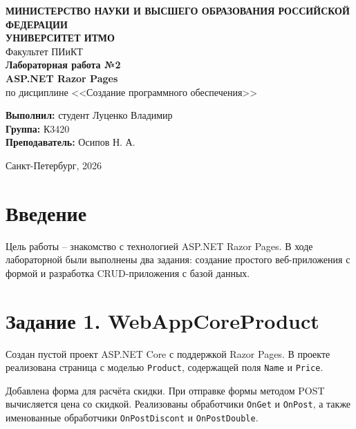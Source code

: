 \documentclass[14pt,a4paper]{extarticle}
\begin{document}
\thispagestyle{empty}
\begin{center}
\textbf{МИНИСТЕРСТВО НАУКИ И ВЫСШЕГО ОБРАЗОВАНИЯ РОССИЙСКОЙ ФЕДЕРАЦИИ}\\[0.3cm]
\textbf{УНИВЕРСИТЕТ ИТМО}\\[0.5cm]
Факультет ПИиКТ\\[1.5cm]

\textbf{\Large Лабораторная работа №2}\\[0.5cm]
\textbf{\large ASP.NET Razor Pages}\\[0.5cm]
по дисциплине <<Создание программного обеспечения>>\\[2cm]
\end{center}

\begin{flushleft}
\hspace{1.25cm}\begin{minipage}[t]{\dimexpr\textwidth-1.25cm\relax}
\textbf{Выполнил:} студент Луценко Владимир\\
\textbf{Группа:} К3420\\
\textbf{Преподаватель:} Осипов Н. А.\\
\end{minipage}
\end{flushleft}

\vfill
\begin{center}
Санкт-Петербург, 2026
\end{center}
\newpage

\tableofcontents
\newpage

\section{Введение}

Цель работы -- знакомство с технологией ASP.NET Razor Pages. В ходе лабораторной были выполнены два задания: создание простого веб-приложения с формой и разработка CRUD-приложения с базой данных.

\section{Задание 1. WebAppCoreProduct}

Создан пустой проект ASP.NET Core с поддержкой Razor Pages. В проекте реализована страница с моделью \texttt{Product}, содержащей поля \texttt{Name} и \texttt{Price}.

Добавлена форма для расчёта скидки. При отправке формы методом POST вычисляется цена со скидкой. Реализованы обработчики \texttt{OnGet} и \texttt{OnPost}, а также именованные обработчики \texttt{OnPostDiscont} и \texttt{OnPostDouble}.
\end{document}

